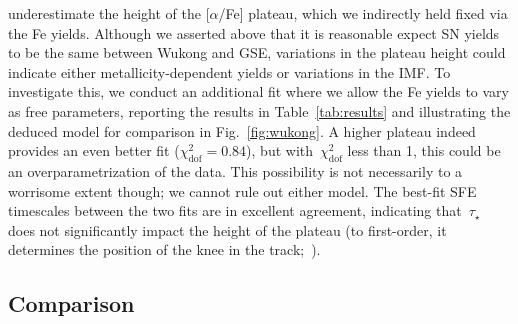 \documentclass[ms.tex]{subfiles}
\begin{document}
underestimate the height of the [$\alpha$/Fe] plateau, which we indirectly
held fixed via the Fe yields.
Although we asserted above that it is reasonable expect SN yields to be the
same between Wukong and GSE, variations in the plateau height could indicate
either metallicity-dependent yields or variations in the IMF.
To investigate this, we conduct an additional fit where we allow the Fe yields
to vary as free parameters, reporting the results in Table~\ref{tab:results}
and illustrating the deduced model for comparison in Fig.~\ref{fig:wukong}.
A higher plateau indeed provides an even better fit
($\chi_\text{dof}^2 = 0.84$), but with~$\chi_\text{dof}^2$ less than 1, this
could be an overparametrization of the data.
This possibility is not necessarily to a worrisome extent though; we cannot
rule out either model.
The best-fit SFE timescales between the two fits are in excellent agreement,
indicating that~$\tau_\star$ does not significantly impact the height of the
plateau (to first-order, it determines the position of the knee in the
track;~\citealp{Weinberg2017}).

\subsection{Comparison}
\label{sec:h3:comparison}
\end{document}
